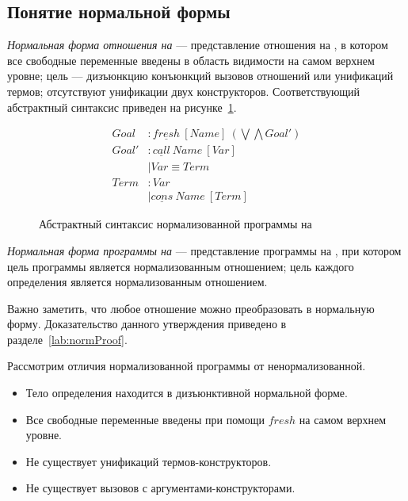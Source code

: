 \subsection{Понятие нормальной формы}
\label{lab:normform}

\emph{Нормальная форма отношения на \miniKanren{}} --- представление отношения на \miniKanren{}, в котором все свободные переменные введены в область видимости на самом верхнем уровне; цель --- дизъюнкцию конъюнкций вызовов отношений или унификаций термов; отсутствуют унификации двух конструкторов.
Соответствующий абстрактный синтаксис приведен на рисунке~\ref{fig:normMiniKanren}.

\begin{figure}[h!]
    \begin{center}
    \begin{minipage}{0.5\textwidth}
    \begin{align*}
      Goal  &: \underline{fresh} \ [Name] \ (\bigvee \bigwedge Goal') \\
      Goal' &: \underline{call} \ Name \ [Var] \\
            &\mid Var \equiv Term \\
      Term  &: Var \\ 
            &\mid \underline{cons} \ Name \ [Term]
    \end{align*}
    \end{minipage}
    \end{center}
  \caption{Абстрактный синтаксис нормализованной программы на \miniKanren{}}
  \label{fig:normMiniKanren}
\end{figure}

\emph{Нормальная форма программы на \miniKanren{}} --- представление программы на \miniKanren{}, при котором цель программы является нормализованным отношением; цель каждого определения является нормализованным отношением. 

Важно заметить, что любое отношение \miniKanren{} можно преобразовать в нормальную форму.
Доказательство данного утверждения приведено в разделе~\ref{lab:normProof}.

Рассмотрим отличия нормализованной программы от ненормализованной.
\begin{itemize}
    \item Тело определения находится в дизъюнктивной нормальной форме.
    \item Все свободные переменные введены при помощи $fresh$ на самом верхнем уровне.
    \item Не существует унификаций термов-конструкторов.
    \item Не существует вызовов с аргументами-конструкторами.
\end{itemize}

